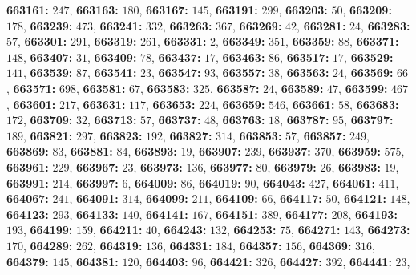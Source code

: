 \textsf{\bfseries 663161:} $247$, \textsf{\bfseries 663163:} $180$, \textsf{\bfseries 663167:} $145$, \textsf{\bfseries 663191:} $299$, \textsf{\bfseries 663203:} $50$, \textsf{\bfseries 663209:} $178$, \textsf{\bfseries 663239:} $473$, \textsf{\bfseries 663241:} $332$, \textsf{\bfseries 663263:} $367$, \textsf{\bfseries 663269:} $42$, \textsf{\bfseries 663281:} $24$, \textsf{\bfseries 663283:} $57$, \textsf{\bfseries 663301:} $291$, \textsf{\bfseries 663319:} $261$, \textsf{\bfseries 663331:} $2$, \textsf{\bfseries 663349:} $351$, \textsf{\bfseries 663359:} $88$, \textsf{\bfseries 663371:} $148$, \textsf{\bfseries 663407:} $31$, \textsf{\bfseries 663409:} $78$, \textsf{\bfseries 663437:} $17$, \textsf{\bfseries 663463:} $86$, \textsf{\bfseries 663517:} $17$, \textsf{\bfseries 663529:} $141$, \textsf{\bfseries 663539:} $87$, \textsf{\bfseries 663541:} $23$, \textsf{\bfseries 663547:} $93$, \textsf{\bfseries 663557:} $38$, \textsf{\bfseries 663563:} $24$, \textsf{\bfseries 663569:} $66$, \textsf{\bfseries 663571:} $698$, \textsf{\bfseries 663581:} $67$, \textsf{\bfseries 663583:} $325$, \textsf{\bfseries 663587:} $24$, \textsf{\bfseries 663589:} $47$, \textsf{\bfseries 663599:} $467$, \textsf{\bfseries 663601:} $217$, \textsf{\bfseries 663631:} $117$, \textsf{\bfseries 663653:} $224$, \textsf{\bfseries 663659:} $546$, \textsf{\bfseries 663661:} $58$, \textsf{\bfseries 663683:} $172$, \textsf{\bfseries 663709:} $32$, \textsf{\bfseries 663713:} $57$, \textsf{\bfseries 663737:} $48$, \textsf{\bfseries 663763:} $18$, \textsf{\bfseries 663787:} $95$, \textsf{\bfseries 663797:} $189$, \textsf{\bfseries 663821:} $297$, \textsf{\bfseries 663823:} $192$, \textsf{\bfseries 663827:} $314$, \textsf{\bfseries 663853:} $57$, \textsf{\bfseries 663857:} $249$, \textsf{\bfseries 663869:} $83$, \textsf{\bfseries 663881:} $84$, \textsf{\bfseries 663893:} $19$, \textsf{\bfseries 663907:} $239$, \textsf{\bfseries 663937:} $370$, \textsf{\bfseries 663959:} $575$, \textsf{\bfseries 663961:} $229$, \textsf{\bfseries 663967:} $23$, \textsf{\bfseries 663973:} $136$, \textsf{\bfseries 663977:} $80$, \textsf{\bfseries 663979:} $26$, \textsf{\bfseries 663983:} $19$, \textsf{\bfseries 663991:} $214$, \textsf{\bfseries 663997:} $6$, \textsf{\bfseries 664009:} $86$, \textsf{\bfseries 664019:} $90$, \textsf{\bfseries 664043:} $427$, \textsf{\bfseries 664061:} $411$, \textsf{\bfseries 664067:} $241$, \textsf{\bfseries 664091:} $314$, \textsf{\bfseries 664099:} $211$, \textsf{\bfseries 664109:} $66$, \textsf{\bfseries 664117:} $50$, \textsf{\bfseries 664121:} $148$, \textsf{\bfseries 664123:} $293$, \textsf{\bfseries 664133:} $140$, \textsf{\bfseries 664141:} $167$, \textsf{\bfseries 664151:} $389$, \textsf{\bfseries 664177:} $208$, \textsf{\bfseries 664193:} $193$, \textsf{\bfseries 664199:} $159$, \textsf{\bfseries 664211:} $40$, \textsf{\bfseries 664243:} $132$, \textsf{\bfseries 664253:} $75$, \textsf{\bfseries 664271:} $143$, \textsf{\bfseries 664273:} $170$, \textsf{\bfseries 664289:} $262$, \textsf{\bfseries 664319:} $136$, \textsf{\bfseries 664331:} $184$, \textsf{\bfseries 664357:} $156$, \textsf{\bfseries 664369:} $316$, \textsf{\bfseries 664379:} $145$, \textsf{\bfseries 664381:} $120$, \textsf{\bfseries 664403:} $96$, \textsf{\bfseries 664421:} $326$, \textsf{\bfseries 664427:} $392$, \textsf{\bfseries 664441:} $23$, 
